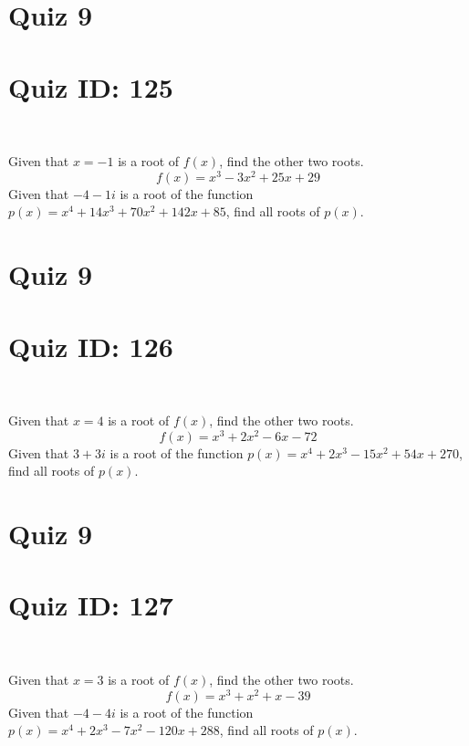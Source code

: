 \documentclass{exam}
\begin{document}
\section*{Quiz 9}
\section*{Quiz ID: 125}
\vspace{0.5cm}\
\vspace{1cm}\
\begin{questions}
\question Given that $x=-1$ is a root of $f(x)$, find the other two roots.\[f(x)=
x^3 - 3x^2 + 25x + 29\]
\newpage
\question Given that $-4-1\mathit{i}$ is a root of the function $p(x)=
x^4 + 14x^3 + 70x^2 + 142x + 85$, find all roots of $p(x)$. 
\end{questions}\newpage
\newpage
\section*{Quiz 9}
\section*{Quiz ID: 126}
\vspace{0.5cm}\
\vspace{1cm}\
\begin{questions}
\question Given that $x=4$ is a root of $f(x)$, find the other two roots.\[f(x)=
x^3 + 2x^2 - 6x - 72\]
\newpage
\question Given that $3+3\mathit{i}$ is a root of the function $p(x)=
x^4 + 2x^3 - 15x^2 + 54x + 270$, find all roots of $p(x)$. \makeemptybox{\stretch{1}}
\end{questions}\newpage
\newpage
\section*{Quiz 9}
\section*{Quiz ID: 127}
\vspace{0.5cm}\
\vspace{1cm}\
\begin{questions}
\question Given that $x=3$ is a root of $f(x)$, find the other two roots.\[f(x)=
x^3 + x^2 + x - 39\]
\newpage
\question Given that $-4-4\mathit{i}$ is a root of the function $p(x)=
x^4 + 2x^3 - 7x^2 - 120x + 288$, find all roots of $p(x)$. \makeemptybox{\stretch{1}}
\end{questions}\newpage
\newpage
\end{document}
